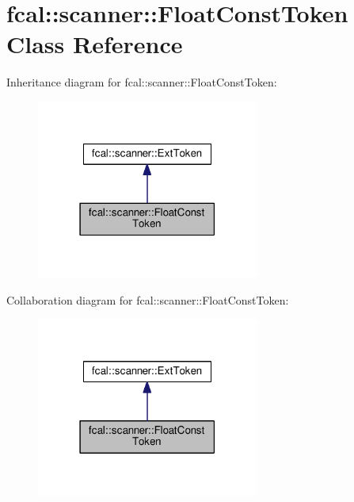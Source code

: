 \hypertarget{classfcal_1_1scanner_1_1FloatConstToken}{}\section{fcal\+:\+:scanner\+:\+:Float\+Const\+Token Class Reference}
\label{classfcal_1_1scanner_1_1FloatConstToken}


Inheritance diagram for fcal\+:\+:scanner\+:\+:Float\+Const\+Token\+:\nopagebreak
\begin{figure}[H]
\begin{center}
\leavevmode
\includegraphics[width=207pt]{classfcal_1_1scanner_1_1FloatConstToken__inherit__graph}
\end{center}
\end{figure}


Collaboration diagram for fcal\+:\+:scanner\+:\+:Float\+Const\+Token\+:\nopagebreak
\begin{figure}[H]
\begin{center}
\leavevmode
\includegraphics[width=207pt]{classfcal_1_1scanner_1_1FloatConstToken__coll__graph}
\end{center}
\end{figure}
